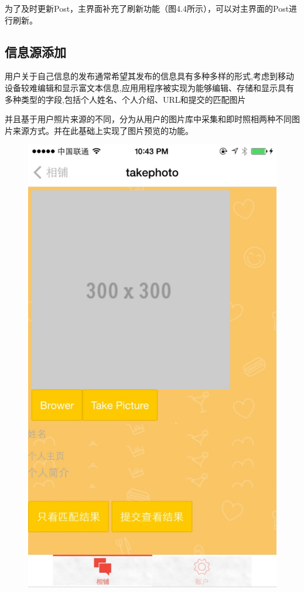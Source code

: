 为了及时更新Post，主界面补充了刷新功能（图4.4所示），可以对主界面的Post进行刷新。

\subsection{信息源添加}
用户关于自己信息的发布通常希望其发布的信息具有多种多样的形式,考虑到移动设备较难编辑和显⽰富⽂本信息,应⽤用程序被实现为能够编辑、存储和显示具有多种类型的字段,包括个人姓名、个人介绍、URL和提交的匹配图片

并且基于用户照片来源的不同，分为从用户的图片库中采集和即时照相两种不同图片来源方式。并在此基础上实现了图片预览的功能。
\begin{figure}[h] 
\begin{minipage}[t]{0.3\linewidth}
\centering
\includegraphics[width=\textwidth]{img/chap4/take1.jpg}

\end{minipage}
\end{figure}
